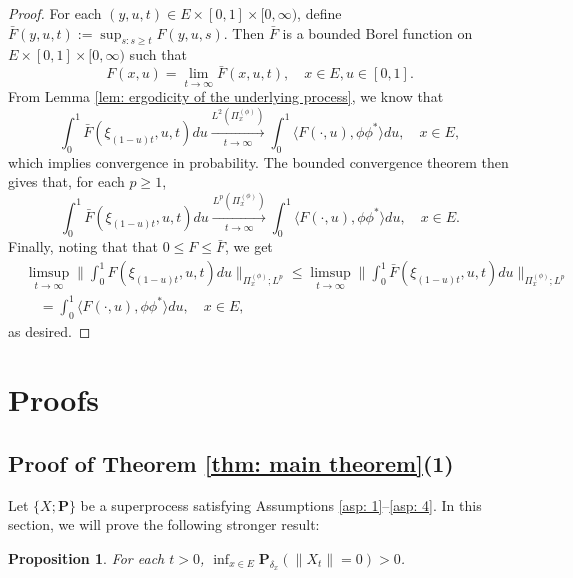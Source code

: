 \documentclass[12pt, a4paper]{amsart}
\newtheorem{prop}[thm]{Proposition}
\theoremstyle{definition}
\numberwithin{equation}{section}
\begin{document}
\begin{proof}
	For each $(y,u,t)\in E\times [0,1]\times [0,\infty)$, define $\bar F(y,u,t) := \sup_{s:s\geq t} F(y,u,s)$.
	Then $\bar F$ is a bounded Borel  function on $E\times [0,1]\times [0,\infty)$
such that
\[
	F(x,u)
	= \lim_{t\to \infty} \bar F(x,u,t),
	\quad x\in E, u\in [0,1].
\]
	From Lemma \ref{lem: ergodicity of the underlying process}, we know that
\[
	\int_0^1 \bar F(\xi_{(1-u)t},u,t) du
	\xrightarrow[t\to \infty]{L^2(\Pi_x^{(\phi)})}
	\int_0^1 \langle F(\cdot , u), \phi\phi^*\rangle du,
	\quad x\in E,
\]
    which implies convergence in probability.
	The bounded convergence theorem then gives that, for each $p \geq 1$,
\[
	\int_0^1 \bar F(\xi_{(1-u)t},u,t) du
	\xrightarrow[t\to \infty]{L^p(\Pi_x^{(\phi)})}
	\int_0^1 \langle F(\cdot , u), \phi\phi^*\rangle du,
	\quad x\in E.
\]
	Finally,
     noting that that
	$0\leq F \leq \bar F$, we get
\[\begin{split}
	& \limsup_{ t \to \infty}  \Big\| \int_0^1 F(\xi_{(1-u) t },u,t) du  \Big\|_{\Pi_x^{(\phi)};L^p}
	\leq 	\limsup_{ t \to \infty}  \Big\| \int_0^1 \bar F(\xi_{(1-u) t },u,t) du  \Big\|_{\Pi_x^{(\phi)};L^p}
	\\& \quad = \int_0^1 \langle F(\cdot, u), \phi \phi^*\rangle du,
	\quad x\in E,
\end{split}\]
	as desired.
\end{proof}

\section{Proofs}
\subsection{Proof of Theorem \ref{thm: main theorem}(1)}
\label{sec: proof of result 1}
	Let $\{X; \mathbf P\}$ be a superprocess satisfying
	Assumptions \ref{asp: 1}--\ref{asp: 4}.
    In this section, we will prove the following stronger result:

\begin{prop}
\label{prop: non-presistent}
	For each $t > 0$, $\inf_{x\in E} \mathbf P_{\delta_x}(\|X_t\|= 0) > 0$.
\end{prop}
\end{document}
